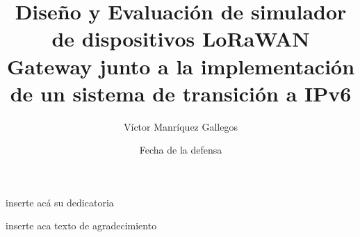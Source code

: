 \documentclass[thesis,final]{udpbook}
\begin{document}
\frontmatter
%
%
\begin{titlepage}                       %
\title{Diseño y Evaluación de simulador de dispositivos LoRaWAN Gateway junto a la implementación de un sistema de transición a IPv6}       %
\author{Víctor Manríquez Gallegos}               %
\date{Fecha de la defensa}              %
\end{titlepage}                         %
%
%
\begin{signaturepage}                   %
%
\end{signaturepage}                     %
%
%
\begin{dedicatory}                      %
inserte acá su dedicatoria              %
\end{dedicatory}                        %
%
%
\tableofcontents                        %
\listoffigures                          %
\listoftables                           %
%
%
\begin{acknowledgment}                  %
inserte aca texto de agradecimiento
\end{acknowledgment}                    %
\end{document}
